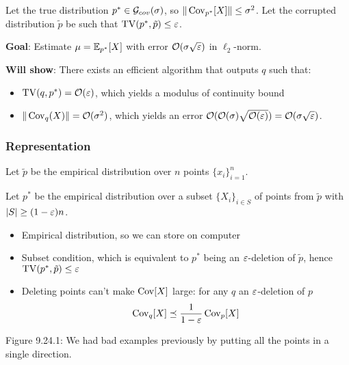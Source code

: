 Let the true distribution $p^* \in \mathcal{G}_{cov}(\sigma)$, so $\|\operatorname{Cov}_{p^*}[X]\| \leq \sigma^2$.
Let the corrupted distribution $\tilde{p}$ be such that $\operatorname{TV}(p^*, \tilde{p}) \leq \varepsilon$.

\textbf{Goal}: Estimate $\mu = \mathbb{E}_{p^*}[X]$ with error
$\mathcal{O}(\sigma \sqrt{\varepsilon})$ in $\ell_2$-norm.

\textbf{Will show}: There exists an efficient algorithm that outputs $q$ such that:
\begin{itemize}
  \item $\operatorname{TV}(q, p^*) = \mathcal{O}(\varepsilon)$, which yields a modulus of continuity bound
  \item $\|\operatorname{Cov}_q(X)\| = \mathcal{O}(\sigma^2)$, which yields an error $\mathcal{O}(\mathcal{O}(\sigma) \sqrt{\mathcal{O}(\varepsilon)}) = \mathcal{O}(\sigma\sqrt{\varepsilon})$.
\end{itemize}

\subsubsection{Representation}%

Let $\tilde{p}$ be the empirical distribution over $n$ points
$\{x_i\}_{i=1}^n$.

Let $p^*$ be the empirical distribution over a subset $\{X_i\}_{i \in S}$ of
points from $\tilde{p}$ with $\lvert S \rvert \geq (1 - \varepsilon)n$.

\begin{itemize}
  \item Empirical distribution, so we can store on computer
  \item Subset condition, which is equivalent to
    $p^*$ being an $\varepsilon$-deletion of $\tilde{p}$,
    hence $\operatorname{TV}(p^*, \tilde{p}) \leq \varepsilon$
  \item Deleting points can't make $\operatorname{Cov}[X]$ large: for
    any $q$ an $\varepsilon$-deletion of $p$
    \begin{align}
      \operatorname{Cov}_q[X] \preceq \frac{1}{1-\varepsilon} \operatorname{Cov}_p[X]
    \end{align}
\end{itemize}

Figure 9.24.1: We had bad examples previously by putting all
the points in a single direction.

